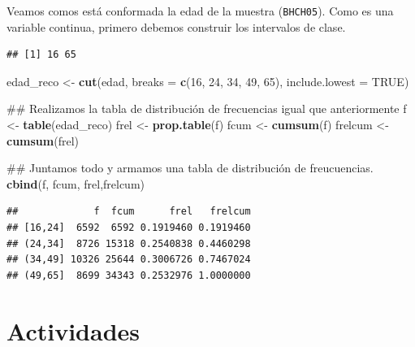 \documentclass[spanish,]{book}
\newenvironment{Shaded}{\begin{snugshade}}{\end{snugshade}}
\newcommand{\KeywordTok}[1]{\textcolor[rgb]{0.13,0.29,0.53}{\textbf{#1}}}
\newcommand{\DataTypeTok}[1]{\textcolor[rgb]{0.13,0.29,0.53}{#1}}
\newcommand{\DecValTok}[1]{\textcolor[rgb]{0.00,0.00,0.81}{#1}}
\newcommand{\StringTok}[1]{\textcolor[rgb]{0.31,0.60,0.02}{#1}}
\newcommand{\OtherTok}[1]{\textcolor[rgb]{0.56,0.35,0.01}{#1}}
\newcommand{\OperatorTok}[1]{\textcolor[rgb]{0.81,0.36,0.00}{\textbf{#1}}}
\newcommand{\NormalTok}[1]{#1}
\begin{document}
Veamos comos está conformada la edad de la muestra (\texttt{BHCH05}).
Como es una variable continua, primero debemos construir los intervalos
de clase.

\begin{Shaded}
\end{Shaded}

\begin{verbatim}
## [1] 16 65
\end{verbatim}

\begin{Shaded}
\begin{Highlighting}[]
\NormalTok{edad_reco <-}\StringTok{ }\KeywordTok{cut}\NormalTok{(edad, }\DataTypeTok{breaks =} \KeywordTok{c}\NormalTok{(}\DecValTok{16}\NormalTok{, }\DecValTok{24}\NormalTok{, }\DecValTok{34}\NormalTok{, }\DecValTok{49}\NormalTok{, }\DecValTok{65}\NormalTok{), }\DataTypeTok{include.lowest =} \OtherTok{TRUE}\NormalTok{)}

\NormalTok{## Realizamos la tabla de distribución de frecuencias igual que anteriormente}
\NormalTok{f <-}\StringTok{ }\KeywordTok{table}\NormalTok{(edad_reco)}
\NormalTok{frel <-}\StringTok{ }\KeywordTok{prop.table}\NormalTok{(f)}
\NormalTok{fcum <-}\StringTok{ }\KeywordTok{cumsum}\NormalTok{(f)}
\NormalTok{frelcum <-}\StringTok{ }\KeywordTok{cumsum}\NormalTok{(frel)}

\NormalTok{## Juntamos todo y armamos una tabla de distribución de freucuencias.}
\KeywordTok{cbind}\NormalTok{(f, fcum, frel,frelcum)}
\end{Highlighting}
\end{Shaded}

\begin{verbatim}
##             f  fcum      frel   frelcum
## [16,24]  6592  6592 0.1919460 0.1919460
## (24,34]  8726 15318 0.2540838 0.4460298
## (34,49] 10326 25644 0.3006726 0.7467024
## (49,65]  8699 34343 0.2532976 1.0000000
\end{verbatim}

\section{Actividades}\label{actividades}
\end{document}
